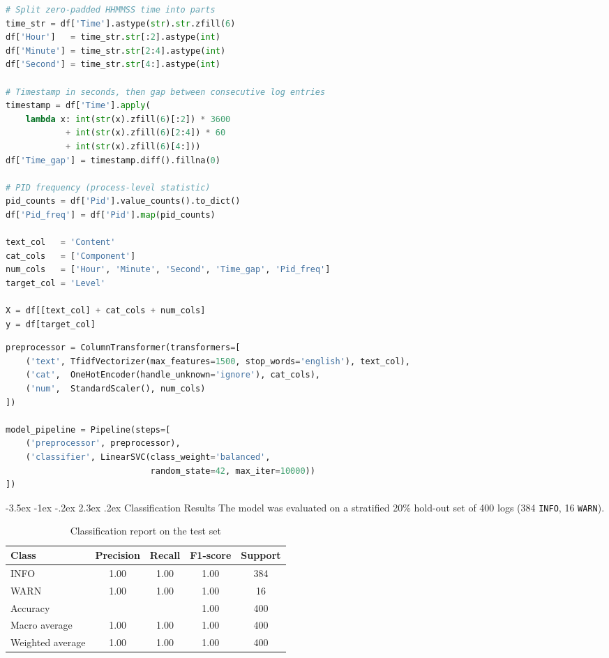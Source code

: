 \documentclass[12pt,a4paper]{report}
\makeatletter
\renewcommand\section{\@startsection {section}{1}{\z@}%
  {-3.5ex \@plus -1ex \@minus -.2ex}%
  {2.3ex \@plus .2ex}%
  {\normalfont\fontsize{17}{21}\selectfont\bfseries}}
\makeatother
\begin{document}
\begin{lstlisting}[language=Python,caption={Feature engineering}]
# Split zero-padded HHMMSS time into parts
time_str = df['Time'].astype(str).str.zfill(6)
df['Hour']   = time_str.str[:2].astype(int)
df['Minute'] = time_str.str[2:4].astype(int)
df['Second'] = time_str.str[4:].astype(int)

# Timestamp in seconds, then gap between consecutive log entries
timestamp = df['Time'].apply(
    lambda x: int(str(x).zfill(6)[:2]) * 3600
            + int(str(x).zfill(6)[2:4]) * 60
            + int(str(x).zfill(6)[4:]))
df['Time_gap'] = timestamp.diff().fillna(0)

# PID frequency (process-level statistic)
pid_counts = df['Pid'].value_counts().to_dict()
df['Pid_freq'] = df['Pid'].map(pid_counts)

text_col   = 'Content'
cat_cols   = ['Component']
num_cols   = ['Hour', 'Minute', 'Second', 'Time_gap', 'Pid_freq']
target_col = 'Level'

X = df[[text_col] + cat_cols + num_cols]
y = df[target_col]
\end{lstlisting}

\begin{lstlisting}[language=Python,caption={Preprocessing and model pipeline with class weighting}]
preprocessor = ColumnTransformer(transformers=[
    ('text', TfidfVectorizer(max_features=1500, stop_words='english'), text_col),
    ('cat',  OneHotEncoder(handle_unknown='ignore'), cat_cols),
    ('num',  StandardScaler(), num_cols)
])

model_pipeline = Pipeline(steps=[
    ('preprocessor', preprocessor),
    ('classifier', LinearSVC(class_weight='balanced',
                             random_state=42, max_iter=10000))
])
\end{lstlisting}

\section{Classification Results}
The model was evaluated on a stratified 20\% hold-out set of 400 logs (384 \texttt{INFO}, 16 \texttt{WARN}).

\begin{table}[htbp]
\centering
\caption{Classification report on the test set}
\label{tab:cr}
\begin{tabular}{lcccc}
\toprule
\textbf{Class} & \textbf{Precision} & \textbf{Recall} & \textbf{F1-score} & \textbf{Support}\\
\midrule
INFO & 1.00 & 1.00 & 1.00 & 384\\
WARN & 1.00 & 1.00 & 1.00 & 16\\
\midrule
Accuracy & & & 1.00 & 400\\
Macro average & 1.00 & 1.00 & 1.00 & 400\\
Weighted average & 1.00 & 1.00 & 1.00 & 400\\
\bottomrule
\end{tabular}
\end{table}
\end{document}
